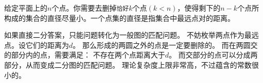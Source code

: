 \begin{prob}
	给定平面上的$n$个点。你需要去删掉\texttt{恰好}$k$个点$(k<n)$，使得剩下的$n-k$个点所构成的集合的直径尽量小。一个点集的直径是指集合中最远点对的距离。
\end{prob}

\begin{sol}
	如果直接二分答案，只能问题转化为一般图的匹配问题。
	不妨枚举两点作为最远点。设它们的距离为$d$。
	那么形成的两圆之外的点是一定要删除的。
	而在两圆交的部分内的点，需要满足：
	不存在两个点距离大于$d$。
	而交部分的点可以分成两部分，从而变成二分图的匹配问题。
	理论复杂度上限非常高，不过蕴含的常数很小的。
\end{sol}
